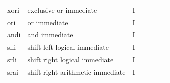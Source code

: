 \documentclass[../main.tex]{subfiles}
\begin{document}
\begin{table}[h]
\begin{tabular}{|l|l|l|llll}
    xori  & exclusive or immediate                & I  &                       &                             &                                                    &                         \\
    ori   & or immediate                          & I  &                       &                             &                                                    &                         \\
    andi  & and immediate                         & I  &                       &                             &                                                    &                         \\
    slli  & shift left logical immediate          & I  &                       &                             &                                                    &                         \\
    srli  & shift right logical immediate         & I  &                       &                             &                                                    &                         \\
    srai  & shift right arithmetic immediate      & I  &                       &                             &                                                    &                         \\ \cline{1-3}
    \end{tabular}
  \end{table}  

  \clearpage
\end{document}
